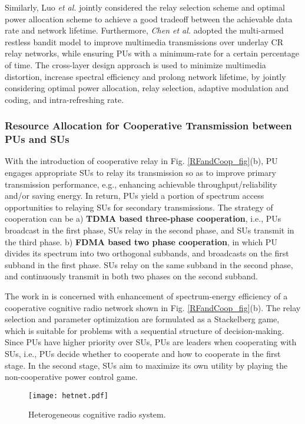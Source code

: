 \documentclass[journal,12pt,onecolumn]{IEEEtran}
\begin{document}
Similarly, Luo \emph{et al.} \cite{relayJoint} jointly considered the relay selection scheme and optimal power allocation scheme to achieve a good tradeoff between the achievable data rate and network lifetime. Furthermore, \emph{Chen et al.} \cite{relayJoint3} adopted the multi-armed restless bandit model to improve multimedia transmissions over underlay CR relay networks, while ensuring PUs with a minimum-rate for a certain percentage of time. The cross-layer design approach is used to minimize multimedia distortion, increase spectral efficiency and prolong network lifetime, by jointly considering optimal power allocation, relay selection, adaptive modulation and coding, and intra-refreshing rate.


\subsubsection{Resource Allocation for Cooperative Transmission between PUs and SUs}
With the introduction of cooperative relay in Fig. \ref{RFandCoop_fig}(b), PU engages appropriate SUs to relay its transmission so as to improve primary transmission performance, e.g., enhancing achievable throughput/reliability and/or saving energy. In return, PUs yield a portion of spectrum access opportunities to relaying SUs for secondary transmissions. The strategy of cooperation can be a) {\bf{TDMA based three-phase cooperation}}, i.e., PUs broadcast in the first phase, SUs relay in the second phase, and SUs transmit in the third phase. b) {\bf{FDMA based two phase cooperation}}, in which PU divides its spectrum into two orthogonal subbands, and broadcasts on the first subband in the first phase. SUs relay on the same subband in the second phase, and continuously transmit in both two phases on the second subband.

The work in \cite{cooperativeRelaygame} is concerned with enhancement of spectrum-energy efficiency of a cooperative cognitive
radio network shown in Fig. \ref{RFandCoop_fig}(b). The relay selection and parameter optimization are formulated as a Stackelberg game, which is suitable for problems with a sequential structure of decision-making. Since PUs have higher priority over SUs, PUs are leaders when cooperating with SUs, i.e., PUs decide whether to cooperate and how to cooperate in the first stage. In the second stage, SUs aim to maximize its own utility by playing the non-cooperative power control game.
\begin{figure*}
\texttt{[image: hetnet.pdf]}
\caption{Heterogeneous cognitive radio system.}
\label{Heterogeneous_fig}
\end{figure*}
\end{document}
